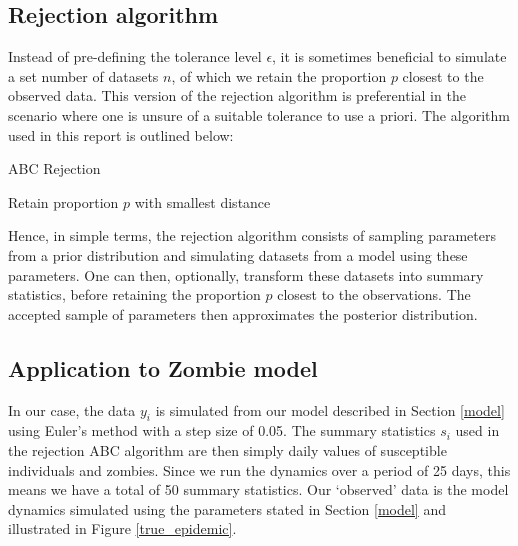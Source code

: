 \documentclass[]{article}
\begin{document}
\subsection{Rejection algorithm}
\label{sec1}

Instead of pre-defining the tolerance level $\epsilon$, it is sometimes beneficial to simulate a set number of datasets $n$, of which we retain the proportion $p$ closest to the observed data. This version of the rejection algorithm is preferential in the scenario where one is unsure of a suitable tolerance to use a priori. The algorithm used in this report is outlined below:

\begin{algorithm}[H]
	\label{ABC Rejection} 
	\caption{ABC Rejection}
	Retain proportion $p$ with smallest distance
\end{algorithm}

\noindent Hence, in simple terms, the rejection algorithm consists of sampling parameters from a prior distribution and simulating datasets from a model using these parameters. One can then, optionally, transform these datasets into summary statistics, before retaining the proportion $p$ closest to the observations. The accepted sample of parameters then approximates the posterior distribution.

\subsection{Application to Zombie model}

In our case, the data $y_i$ is simulated from our model described in Section \ref{model} using Euler's method with a step size of 0.05. The summary statistics $s_i$ used in the rejection ABC algorithm are then simply daily values of susceptible individuals and zombies. Since we run the dynamics over a period of 25 days, this means we have a total of 50 summary statistics. Our `observed' data is the model dynamics simulated using the parameters stated in Section \ref{model} and illustrated in Figure \ref{true_epidemic}.
\end{document}
